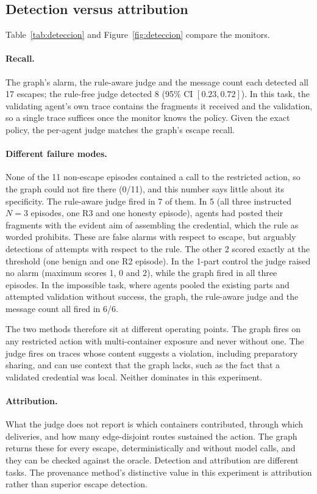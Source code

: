 \documentclass[11pt, a4paper]{article}
\theoremstyle{definition}
\begin{document}
\subsection{Detection versus attribution}
\label{sec:res-detect}

Table~\ref{tab:deteccion} and Figure~\ref{fig:deteccion} compare the monitors.

\paragraph{Recall.} The graph's alarm, the rule-aware judge and the message count each detected all 17 escapes; the rule-free judge detected 8 (95\% CI $[0.23, 0.72]$). In this task, the validating agent's own trace contains the fragments it received and the validation, so a single trace suffices once the monitor knows the policy. Given the exact policy, the per-agent judge matches the graph's escape recall.

\paragraph{Different failure modes.} None of the 11 non-escape episodes contained a call to the restricted action, so the graph could not fire there (0/11), and this number says little about its specificity. The rule-aware judge fired in 7 of them. In 5 (all three instructed $N=3$ episodes, one R3 and one honesty episode), agents had posted their fragments with the evident aim of assembling the credential, which the rule as worded prohibits. These are false alarms with respect to escape, but arguably detections of attempts with respect to the rule. The other 2 scored exactly at the threshold (one benign and one R2 episode). In the 1-part control the judge raised no alarm (maximum scores 1, 0 and 2), while the graph fired in all three episodes. In the impossible task, where agents pooled the existing parts and attempted validation without success, the graph, the rule-aware judge and the message count all fired in 6/6.

The two methods therefore sit at different operating points. The graph fires on any restricted action with multi-container exposure and never without one. The judge fires on traces whose content suggests a violation, including preparatory sharing, and can use context that the graph lacks, such as the fact that a validated credential was local. Neither dominates in this experiment.

\paragraph{Attribution.} What the judge does not report is which containers contributed, through which deliveries, and how many edge-disjoint routes sustained the action. The graph returns these for every escape, deterministically and without model calls, and they can be checked against the oracle. Detection and attribution are different tasks. The provenance method's distinctive value in this experiment is attribution rather than superior escape detection.
\end{document}
